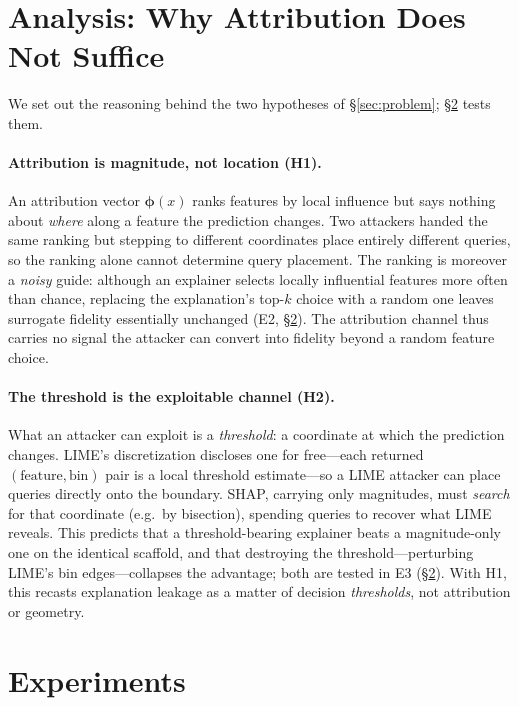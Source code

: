 \documentclass[sigconf,anonymous,review]{acmart}
\begin{document}
\section{Analysis: Why Attribution Does Not Suffice}
\label{sec:analysis}
We set out the reasoning behind the two hypotheses of \S\ref{sec:problem}; \S\ref{sec:experiments}
tests them.

\paragraph{Attribution is magnitude, not location (H1).}
An attribution vector $\bm{\phi}(x)$ ranks features by local influence but says nothing about
\emph{where} along a feature the prediction changes. Two attackers handed the same ranking but
stepping to different coordinates place entirely different queries, so the ranking alone cannot
determine query placement. The ranking is moreover a \emph{noisy} guide: although an explainer
selects locally influential features more often than chance, replacing the explanation's top-$k$
choice with a random one leaves surrogate fidelity essentially unchanged (E2,
\S\ref{sec:experiments}). The attribution channel thus carries no signal the attacker can convert
into fidelity beyond a random feature choice.

\paragraph{The threshold is the exploitable channel (H2).}
What an attacker can exploit is a \emph{threshold}: a coordinate at which the prediction changes.
LIME's discretization discloses one for free---each returned $(\text{feature}, \text{bin})$ pair is
a local threshold estimate---so a LIME attacker can place queries directly onto the boundary. SHAP,
carrying only magnitudes, must \emph{search} for that coordinate (e.g.\ by bisection), spending
queries to recover what LIME reveals. This predicts that a threshold-bearing explainer beats a
magnitude-only one on the identical scaffold, and that destroying the threshold---perturbing LIME's
bin edges---collapses the advantage; both are tested in E3 (\S\ref{sec:experiments}). With H1, this
recasts explanation leakage as a matter of decision \emph{thresholds}, not attribution or geometry.

\section{Experiments}
\label{sec:experiments}
\end{document}
